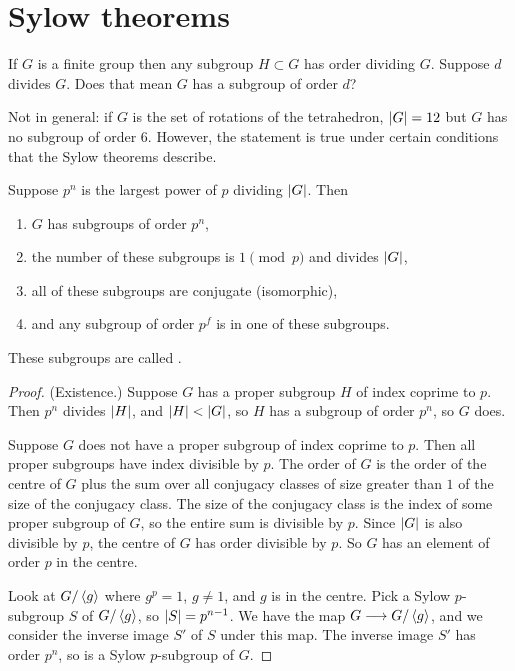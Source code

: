 \documentclass[11pt, twoside]{amsart}
\begin{document}
\section{Sylow theorems}
If $G$ is a finite group then any subgroup $H\subset G$ has order dividing $G$. Suppose $d$ divides $G$. Does that mean $G$ has a subgroup of order $d$? 

Not in general: if $G$ is the set of rotations of the tetrahedron, $\left \lvert G \right \rvert = 12$ but $G$ has no subgroup of order $6$. However, the statement is true under certain conditions that the Sylow theorems describe.

\begin{theorem}[Sylow]\label{Sylow}
Suppose $p^n$ is the largest power of $p$ dividing $\left \lvert G \right \rvert$. Then
\begin{enumerate}
\item $G$ has subgroups of order $p^n$,
\item the number of these subgroups is $1\pmod p$ and divides $\left \lvert G \right \rvert$,
\item all of these subgroups are conjugate (isomorphic),
\item and any subgroup of order $p^f$ is in one of these subgroups.
\end{enumerate}
\end{theorem}
These subgroups are called .
\begin{proof}
(Existence.) Suppose $G$ has a proper subgroup $H$ of index coprime to $p$. Then $p^n$ divides $\left \lvert H \right \rvert$, and $\left \lvert H \right \rvert < \left \lvert G \right \rvert$, so $H$ has a subgroup of order $p^n$, so $G$ does.

Suppose $G$ does not have a proper subgroup of index coprime to $p$. Then all proper subgroups have index divisible by $p$. The order of $G$ is the order of the centre of $G$ plus the sum over all conjugacy classes of size greater than $1$ of the size of the conjugacy class. The size of the conjugacy class is the index of some proper subgroup of $G$, so the entire sum is divisible by $p$. Since $\left \lvert G \right \rvert$ is also divisible by $p$, the centre of $G$ has order divisible by $p$. So $G$ has an element of order $p$ in the centre. 

Look at $G/\left \langle g \right \rangle$ where $g^p = 1$, $g\neq 1$, and $g$ is in the centre. Pick a Sylow $p$-subgroup $S$ of $G/\left \langle g \right \rangle $, so $\left \lvert S \right \rvert = p^{n-1}$. We have the map $G\longrightarrow G/\left \langle g \right \rangle$, and we consider the inverse image $S'$ of $S$ under this map. The inverse image $S'$ has order $p^n$, so is a Sylow $p$-subgroup of $G$.
\end{proof}
\end{document}
